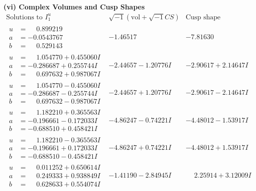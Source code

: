 \documentclass[1p]{elsarticle_modified}
\theoremstyle{definition}
\newcommand{\I}{\sqrt{-1}}
\begin{document}
\newpage\flushleft \textbf{(vi) Complex Volumes and Cusp Shapes}
$$\begin{array}{c|c|c}  
\text{Solutions to }I^u_{1}& \I (\text{vol} + \sqrt{-1}CS) & \text{Cusp shape}\\
 \hline 
\begin{aligned}
u &= \phantom{-}0.899219\phantom{ +0.000000I} \\
a &= -0.0543767\phantom{ +0.000000I} \\
b &= \phantom{-}0.529143\phantom{ +0.000000I}\end{aligned}
 & -1.46517\phantom{ +0.000000I} & -7.81630\phantom{ +0.000000I} \\ \hline\begin{aligned}
u &= \phantom{-}1.054770 + 0.455060 I \\
a &= -0.286687 + 0.255744 I \\
b &= \phantom{-}0.697632 + 0.987067 I\end{aligned}
 & -2.44657 - 1.20776 I & -2.90617 + 2.14647 I \\ \hline\begin{aligned}
u &= \phantom{-}1.054770 - 0.455060 I \\
a &= -0.286687 - 0.255744 I \\
b &= \phantom{-}0.697632 - 0.987067 I\end{aligned}
 & -2.44657 + 1.20776 I & -2.90617 - 2.14647 I \\ \hline\begin{aligned}
u &= \phantom{-}1.182210 + 0.365563 I \\
a &= -0.196661 - 0.172033 I \\
b &= -0.688510 + 0.458421 I\end{aligned}
 & -4.86247 - 0.74221 I & -4.48012 - 1.53917 I \\ \hline\begin{aligned}
u &= \phantom{-}1.182210 - 0.365563 I \\
a &= -0.196661 + 0.172033 I \\
b &= -0.688510 - 0.458421 I\end{aligned}
 & -4.86247 + 0.74221 I & -4.48012 + 1.53917 I \\ \hline\begin{aligned}
u &= \phantom{-}0.011252 + 0.650614 I \\
a &= \phantom{-}0.249333 + 0.938849 I \\
b &= \phantom{-}0.628633 + 0.554074 I\end{aligned}
 & -1.41190 - 2.84945 I & \phantom{-}2.25914 + 3.12009 I \\ \hline\begin{aligned}

\end{aligned}
\end{array}$$
\end{document}
